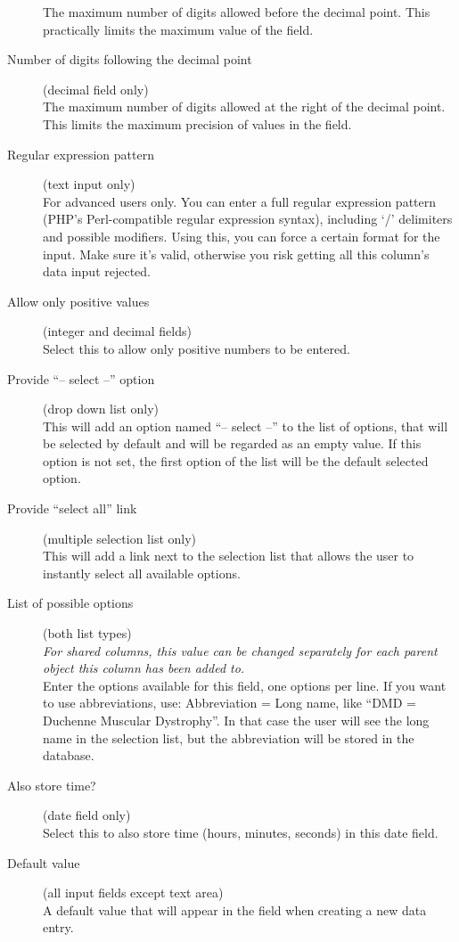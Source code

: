 \begin{description}
  The maximum number of digits allowed before the decimal point.
  This practically limits the maximum value of the field.
  \item[Number of digits following the decimal point] (decimal field only)\hfill \\
  The maximum number of digits allowed at the right of the decimal point.
  This limits the maximum precision of values in the field.
  \item[Regular expression pattern] (text input only)\hfill \\
  For advanced users only.
  You can enter a full regular expression pattern (PHP's Perl-compatible regular expression syntax), including `/' delimiters and possible modifiers.
  Using this, you can force a certain format for the input.
  Make sure it's valid, otherwise you risk getting all this column's data input rejected.
  \item[Allow only positive values] (integer and decimal fields)\hfill \\
  Select this to allow only positive numbers to be entered.
  \item[Provide ``-- select --'' option] (drop down list only)\hfill \\
  This will add an option named ``-- select --'' to the list of options, that will be selected by default and will be regarded as an empty value.
  If this option is not set, the first option of the list will be the default selected option.
  \item[Provide ``select all'' link] (multiple selection list only)\hfill \\
  This will add a link next to the selection list that allows the user to instantly select all available options.
  \item[List of possible options] (both list types)\hfill \\
  \emph{For shared columns, this value can be changed separately for each parent object this column has been added to.}
  \\
  Enter the options available for this field, one options per line.
  If you want to use abbreviations, use: Abbreviation = Long name, like ``DMD = Duchenne Muscular Dystrophy''.
  In that case the user will see the long name in the selection list, but the abbreviation will be stored in the database.
  \item[Also store time?] (date field only)\hfill \\
  Select this to also store time (hours, minutes, seconds) in this date field.
  \item[Default value] (all input fields except text area)\hfill \\
  A default value that will appear in the field when creating a new data entry.
\end{description}

